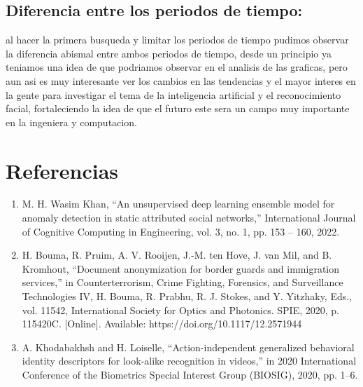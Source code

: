 \documentclass[conference]{IEEEtran}
\begin{document}
\subsection{Diferencia entre los periodos de tiempo:}
al hacer la primera busqueda y limitar los periodos de tiempo pudimos observar la diferencia abismal entre ambos periodos de tiempo, desde un principio ya teniamos una idea de que podriamos observar en el analisis de las graficas, pero aun asi es muy interesante ver los cambios en las tendencias y el mayor interes en la gente para investigar el tema de la inteligencia artificial y el reconocimiento facial, fortaleciendo la idea de que el futuro este sera un campo muy importante en la ingeniera y computacion.
\section{Referencias}

\begin{enumerate}
    \item M. H. Wasim Khan, “An unsupervised deep learning ensemble model for anomaly detection in static attributed social networks,” International Journal of Cognitive Computing in Engineering, vol. 3, no. 1, pp. 153 – 160, 2022.

    \item H. Bouma, R. Pruim, A. V. Rooijen, J.-M. ten Hove, J. van Mil, and B. Kromhout, “Document anonymization for border guards and immigration services,” in Counterterrorism, Crime Fighting, Forensics, and Surveillance Technologies IV, H. Bouma, R. Prabhu, R. J. Stokes, and Y. Yitzhaky, Eds., vol. 11542, International Society for Optics and Photonics. SPIE, 2020, p. 115420C. [Online]. Available: https://doi.org/10.1117/12.2571944

    \item A. Khodabakhsh and H. Loiselle, “Action-independent generalized behavioral identity descriptors for look-alike recognition in videos,” in 2020 International Conference of the Biometrics Special Interest Group (BIOSIG), 2020, pp. 1–6.
\end{enumerate}


\end{document}
